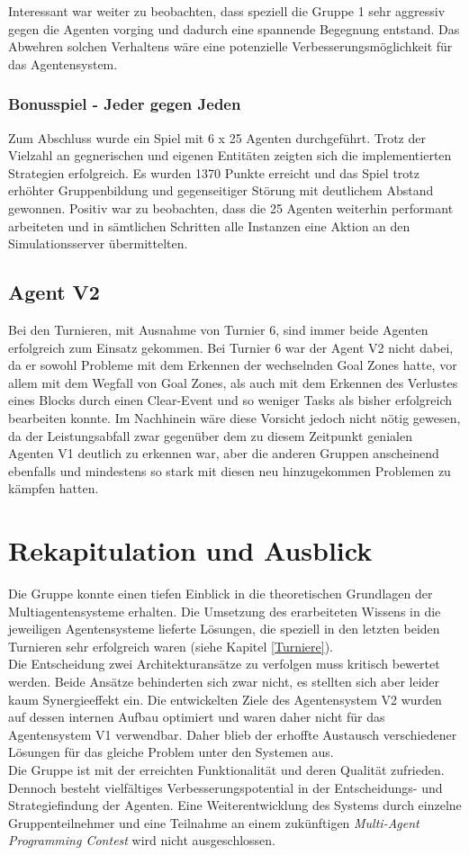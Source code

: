 \documentclass[runningheads]{llncs}
\begin{document}
	Interessant war weiter zu beobachten, dass speziell die Gruppe 1 sehr aggressiv gegen die Agenten vorging und dadurch eine spannende Begegnung entstand. Das Abwehren solchen Verhaltens wäre eine potenzielle Verbesserungsmöglichkeit für das Agentensystem. 
	
	\subsubsection{Bonusspiel - Jeder gegen Jeden}
	Zum Abschluss wurde ein Spiel mit 6 x 25 Agenten durchgeführt. Trotz der Vielzahl an gegnerischen und eigenen Entitäten zeigten sich die implementierten Strategien erfolgreich. Es wurden 1370 Punkte erreicht und das Spiel trotz erhöhter Gruppenbildung und gegenseitiger Störung mit deutlichem Abstand gewonnen.
	Positiv war zu beobachten, dass die 25 Agenten weiterhin performant arbeiteten und in sämtlichen Schritten alle Instanzen eine Aktion an den Simulationsserver übermittelten.  
	
	\subsection{Agent V2}
	Bei den Turnieren, mit Ausnahme von Turnier 6, sind immer beide Agenten erfolgreich zum Einsatz gekommen. Bei Turnier 6 war der Agent V2 nicht dabei, da er sowohl Probleme mit dem Erkennen der wechselnden Goal Zones hatte, vor allem mit dem Wegfall von Goal Zones, als auch mit dem Erkennen des Verlustes eines Blocks durch einen Clear-Event und so weniger Tasks als bisher erfolgreich bearbeiten konnte. Im Nachhinein wäre diese Vorsicht jedoch nicht nötig gewesen, da der Leistungsabfall zwar gegenüber dem zu diesem Zeitpunkt genialen Agenten V1 deutlich zu erkennen war, aber die anderen Gruppen anscheinend ebenfalls und mindestens so stark mit diesen neu hinzugekommen Problemen zu kämpfen hatten. 
	
	\section{Rekapitulation und Ausblick}
	Die Gruppe konnte einen tiefen Einblick in die theoretischen Grundlagen der Multiagentensysteme erhalten. Die Umsetzung des erarbeiteten Wissens in die jeweiligen Agentensysteme lieferte Lösungen, die speziell in den letzten beiden Turnieren sehr erfolgreich waren (siehe Kapitel \ref{Turniere}). \\
	Die Entscheidung zwei Architekturansätze zu verfolgen muss kritisch bewertet werden. Beide Ansätze behinderten sich zwar nicht, es stellten sich aber leider kaum Synergieeffekt ein. Die entwickelten Ziele des Agentensystem V2 wurden auf dessen internen Aufbau optimiert und waren daher nicht für das Agentensystem V1 verwendbar. Daher blieb der erhoffte Austausch verschiedener Lösungen für das gleiche Problem unter den Systemen aus. \\
	Die Gruppe ist mit der erreichten Funktionalität und deren Qualität zufrieden. Dennoch besteht vielfältiges Verbesserungspotential in der Entscheidungs- und Strategiefindung der Agenten.
	Eine Weiterentwicklung des Systems durch einzelne Gruppenteilnehmer und eine Teilnahme an einem zukünftigen \textit{Multi-Agent Programming Contest} wird nicht ausgeschlossen.
	
\end{document}
